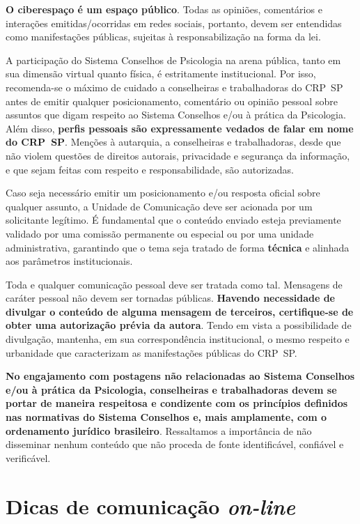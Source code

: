 \textbf{O ciberespaço é um espaço público}. Todas as opiniões,
comentários e interações emitidas/ocorridas em redes sociais, portanto,
devem ser entendidas como manifestações públicas, sujeitas à
responsabilização na forma da lei.

A participação do Sistema Conselhos de Psicologia na arena pública,
tanto em sua dimensão virtual quanto física, é estritamente
institucional. Por isso, recomenda-se o máximo de cuidado a conselheiras
e trabalhadoras do CRP~SP antes de emitir qualquer posicionamento,
comentário ou opinião pessoal sobre assuntos que digam respeito ao
Sistema Conselhos e/ou à prática da Psicologia. Além disso,
\textbf{perfis pessoais são expressamente vedados de falar em nome do
  CRP~SP}. Menções à autarquia, a conselheiras e trabalhadoras, desde que
não violem questões de direitos autorais, privacidade e segurança da
informação, e que sejam feitas com respeito e responsabilidade, são
autorizadas.

Caso seja necessário emitir um posicionamento e/ou resposta oficial
sobre qualquer assunto, a Unidade de Comunicação deve ser acionada por
um solicitante legítimo. É fundamental que o conteúdo enviado esteja
previamente validado por uma comissão permanente ou especial ou por uma
unidade administrativa, garantindo que o tema seja tratado de forma
\textbf{técnica} e alinhada aos parâmetros institucionais.

Toda e qualquer comunicação pessoal deve ser tratada como tal. Mensagens
de caráter pessoal não devem ser tornadas públicas. \textbf{Havendo
  necessidade de divulgar o conteúdo de alguma mensagem de terceiros,
  certifique-se de obter uma autorização prévia da autora}. Tendo em vista
a possibilidade de divulgação, mantenha, em sua correspondência
institucional, o mesmo respeito e urbanidade que caracterizam as
manifestações públicas do CRP~SP.

\textbf{No engajamento com postagens não relacionadas ao Sistema
  Conselhos e/ou à prática da Psicologia, conselheiras e trabalhadoras
  devem se portar de maneira respeitosa e condizente com os princípios
  definidos nas normativas do Sistema Conselhos e, mais amplamente, com o
  ordenamento jurídico brasileiro}. Ressaltamos a importância de não
disseminar nenhum conteúdo que não proceda de fonte identificável,
confiável e verificável.

\section{\texorpdfstring{Dicas de comunicação
    \emph{on-line}}{Dicas de comunicação on-line}}

